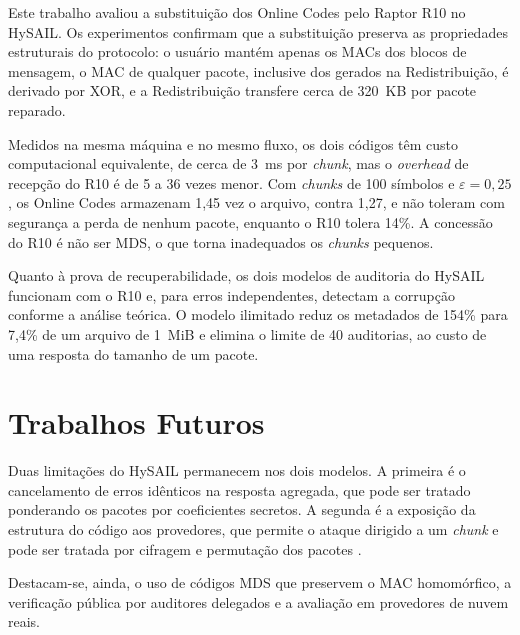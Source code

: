 Este trabalho avaliou a substituição dos Online Codes pelo Raptor R10 no HySAIL. Os experimentos confirmam que a substituição preserva as propriedades estruturais do protocolo: o usuário mantém apenas os \acrshort{MAC}s dos blocos de mensagem, o \acrshort{MAC} de qualquer pacote, inclusive dos gerados na Redistribuição, é derivado por XOR, e a Redistribuição transfere cerca de 320~KB por pacote reparado.

Medidos na mesma máquina e no mesmo fluxo, os dois códigos têm custo computacional equivalente, de cerca de 3~ms por \emph{chunk}, mas o \emph{overhead} de recepção do R10 é de 5 a 36 vezes menor. Com \emph{chunks} de 100 símbolos e $\varepsilon = 0{,}25$, os Online Codes armazenam 1,45 vez o arquivo, contra 1,27, e não toleram com segurança a perda de nenhum pacote, enquanto o R10 tolera 14\%. A concessão do R10 é não ser MDS, o que torna inadequados os \emph{chunks} pequenos.

Quanto à prova de recuperabilidade, os dois modelos de auditoria do HySAIL funcionam com o R10 e, para erros independentes, detectam a corrupção conforme a análise teórica. O modelo ilimitado reduz os metadados de 154\% para 7,4\% de um arquivo de 1~MiB e elimina o limite de 40 auditorias, ao custo de uma resposta do tamanho de um pacote.

\section{Trabalhos Futuros}

Duas limitações do HySAIL permanecem nos dois modelos. A primeira é o cancelamento de erros idênticos na resposta agregada, que pode ser tratado ponderando os pacotes por coeficientes secretos. A segunda é a exposição da estrutura do código aos provedores, que permite o ataque dirigido a um \emph{chunk} e pode ser tratada por cifragem e permutação dos pacotes \cite{juels2007pors,bowers2009proofs}.

Destacam-se, ainda, o uso de códigos MDS que preservem o \acrshort{MAC} homomórfico, a verificação pública por auditores delegados \cite{armknecht2021outsourcing,shen2024public} e a avaliação em provedores de nuvem reais.
